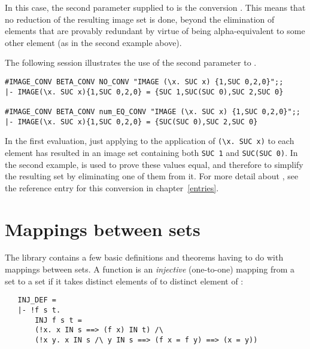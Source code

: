 \noindent In this case, the second parameter supplied to  is
the conversion . This means that no reduction of the resulting
image set is done, beyond the elimination of elements that are provably
redundant by virtue of being alpha-equivalent to some other element (as in the
second example above).

The following session illustrates the use of the second parameter to
.  

\begin{session}\begin{verbatim}
#IMAGE_CONV BETA_CONV NO_CONV "IMAGE (\x. SUC x) {1,SUC 0,2,0}";;
|- IMAGE(\x. SUC x){1,SUC 0,2,0} = {SUC 1,SUC(SUC 0),SUC 2,SUC 0}

#IMAGE_CONV BETA_CONV num_EQ_CONV "IMAGE (\x. SUC x) {1,SUC 0,2,0}";;
|- IMAGE(\x. SUC x){1,SUC 0,2,0} = {SUC(SUC 0),SUC 2,SUC 0}
\end{verbatim}\end{session}

\noindent In the first evaluation, just applying  to the
application of {\small\verb!(\x. SUC x)!} to each element has resulted in an
image set containing both {\small\verb!SUC 1!} and {\small\verb!SUC(SUC 0)!}.
In the second example,  is used to prove these values equal,
and therefore to simplify the resulting set by eliminating one of them from it.
For more detail about , see the reference entry for this
conversion in chapter~\ref{entries}.%

\section{Mappings between sets}

The  library contains a few basic definitions and theorems having to
do with mappings between sets.  A function  is an {\it injective\/}
(one-to-one) mapping from a set  to a set  if it
takes distinct elements of  to distinct element of :

\begin{hol}
\begin{verbatim}
   INJ_DEF = 
   |- !f s t.
       INJ f s t =
       (!x. x IN s ==> (f x) IN t) /\
       (!x y. x IN s /\ y IN s ==> (f x = f y) ==> (x = y))
\end{verbatim}\end{hol}

